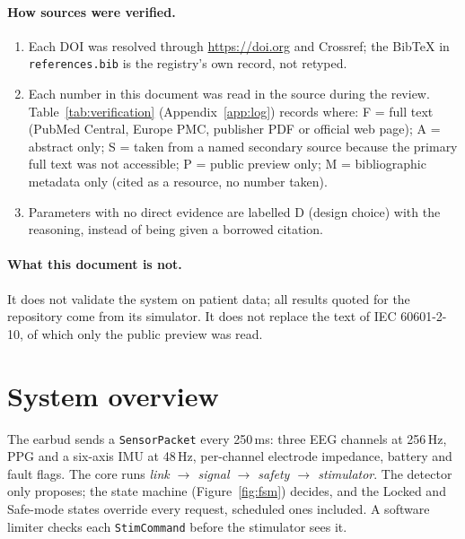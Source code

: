 \documentclass[10pt,a4paper]{article}
\newcommand{\code}[1]{\texttt{\small #1}}
\newcommand{\lvl}[1]{\textsf{\small #1}}
\begin{document}
\paragraph{How sources were verified.}
\begin{enumerate}
  \item Each DOI was resolved through \url{https://doi.org} and Crossref; the BibTeX in \code{references.bib} is the
        registry's own record, not retyped.
  \item Each number in this document was read in the source during the review. Table~\ref{tab:verification}
        (Appendix~\ref{app:log}) records where: \lvl{F} = full text (PubMed Central, Europe PMC, publisher PDF or
        official web page); \lvl{A} = abstract only; \lvl{S} = taken from a named secondary source because the primary
        full text was not accessible; \lvl{P} = public preview only; \lvl{M} = bibliographic metadata only (cited as a resource, no number taken).
  \item Parameters with no direct evidence are labelled \lvl{D} (design choice) with the reasoning, instead of being
        given a borrowed citation.
\end{enumerate}

\paragraph{What this document is not.} It does not validate the system on patient data; all results quoted for the
repository come from its simulator. It does not replace the text of IEC 60601-2-10, of which only the public preview
was read.

\section{System overview}\label{sec:system}

The earbud sends a \code{SensorPacket} every 250\,ms: three EEG channels at 256\,Hz, PPG and a six-axis IMU at 48\,Hz,
per-channel electrode impedance, battery and fault flags. The core runs
\emph{link $\rightarrow$ signal $\rightarrow$ safety $\rightarrow$ stimulator}. The detector only proposes; the state
machine (Figure~\ref{fig:fsm}) decides, and the Locked and Safe-mode states override every request, scheduled ones
included. A software limiter checks each \code{StimCommand} before the stimulator sees it.
\end{document}
